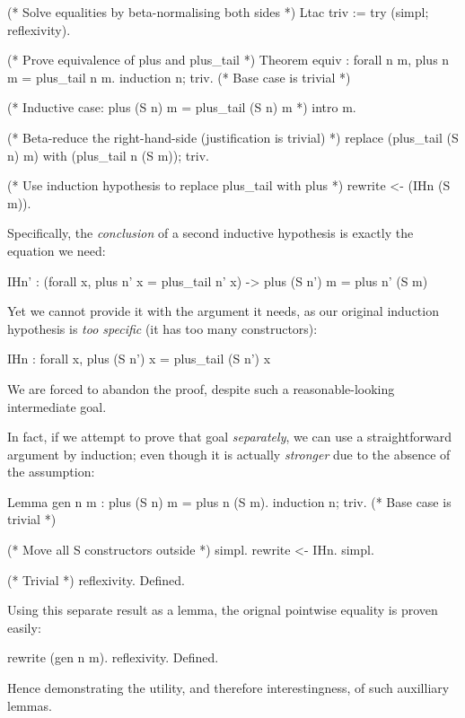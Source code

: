 \begin{coqblock}
(* Solve equalities by beta-normalising both sides *)
Ltac triv := try (simpl; reflexivity).

(* Prove equivalence of plus and plus_tail *)
Theorem equiv : forall n m, plus n m = plus_tail n m.
  induction n; triv. (* Base case is trivial *)

  (* Inductive case: plus (S n) m = plus_tail (S n) m *)
  intro m.

  (* Beta-reduce the right-hand-side (justification is trivial) *)
  replace (plus_tail (S n) m) with (plus_tail n (S m)); triv.

  (* Use induction hypothesis to replace plus_tail with plus *)
  rewrite <- (IHn (S m)).
\end{coqblock}

Specifically, the \emph{conclusion} of a second inductive hypothesis is exactly
the equation we need:

\begin{coqblock}
IHn' : (forall x, plus n' x = plus_tail n' x) -> plus (S n') m = plus n' (S m)
\end{coqblock}

Yet we cannot provide it with the argument it needs, as our original induction
hypothesis is \emph{too specific} (it has too many  constructors):

\begin{coqblock}
IHn : forall x, plus (S n') x = plus_tail (S n') x
\end{coqblock}

We are forced to abandon the proof, despite such a reasonable-looking
intermediate goal.

In fact, if we attempt to prove that goal \emph{separately}, we can use a
straightforward argument by induction; even though it is actually
\emph{stronger} due to the absence of the  assumption:

\begin{coqblock}
Lemma gen n m : plus (S n) m = plus n (S m).
  induction n; triv. (* Base case is trivial *)

  (* Move all S constructors outside *)
  simpl. rewrite <- IHn. simpl.

  (* Trivial *)
  reflexivity.
Defined.
\end{coqblock}

Using this separate result as a lemma, the orignal pointwise equality is proven
easily:

\begin{coqblock}
  rewrite (gen n m).
  reflexivity.
Defined.
\end{coqblock}

Hence demonstrating the utility, and therefore interestingness, of such
auxilliary lemmas.



